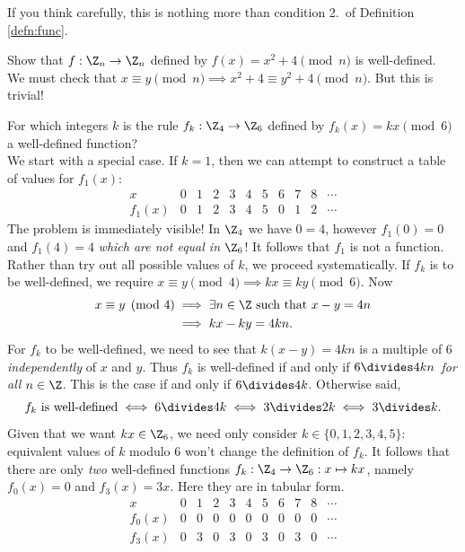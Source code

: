 \noindent If you think carefully, this is nothing more than condition 2.\ of Definition \ref{defn:func}.

\begin{examples}
	\item Show that $f:\Z_n\to\Z_n$ defined by $f(x)=x^2+4\pmod n$ is well-defined.\\[5pt]
	We must check that $x\equiv y\pmod n\implies x^2+4\equiv y^2+4\pmod n$. But this is trivial!
	\item For which integers $k$ is the rule $f_k:\Z_4\to\Z_6$ defined by $f_k(x)=kx\pmod 6$ a well-defined function?\\[5pt]
	We start with a special case. If $k=1$, then we can attempt to construct a table of values for $f_1(x)$:
	\[\begin{array}{c|cccc|cccc|cc}
	x&0&1&2&3&4&5&6&7&8&\cdots\\\hline
	f_1(x)&0&1&2&3&4&5&0&1&2&\cdots
	\end{array}\]
	The problem is immediately visible! In $\Z_4$ we have $0=4$, however $f_1(0)=0$ and $f_1(4)=4$ \emph{which are not equal in $\Z_6$}! It follows that $f_1$ is not a function.\\[5pt]
	Rather than try out all possible values of $k$, we proceed systematically. If $f_k$ is to be well-defined, we require $x\equiv y\pmod 4\implies kx\equiv ky\pmod 6$. Now
	\begin{align*}
	x\equiv y\pmod 4&\implies \exists n\in\Z\text{ such that }x-y=4n\\*
	&\implies kx-ky=4kn.
	\end{align*}
	For $f_k$ to be well-defined, we need to see that $k(x-y)=4kn$ is a multiple of 6 \emph{independently} of $x$ and $y$. Thus $f_k$ is well-defined if and only if $6\divides 4kn$\, \emph{for all} $n\in\Z$. This is the case if and only if $6\divides 4k$. Otherwise said,
	\[\text{$f_k$ is well-defined}\iff 6\divides 4k\iff 3\divides 2k\iff 3\divides k.\]
	Given that we want $kx\in\Z_6$, we need only consider $k\in\{0,1,2,3,4,5\}$: equivalent values of $k$ modulo 6 won't change the definition of $f_k$. It follows that there are only \emph{two} well-defined functions $f_k:\Z_4\to\Z_6:x\mapsto kx$, namely $f_0(x)=0$ and $f_3(x)=3x$. Here they are in tabular form.
	\[\begin{array}{c|cccc|cccc|cc}
	x&0&1&2&3&4&5&6&7&8&\cdots\\\hline
	f_0(x)&0&0&0&0&0&0&0&0&0&\cdots\\\hline
	f_3(x)&0&3&0&3&0&3&0&3&0&\cdots
	\end{array}\]

\end{examples}
